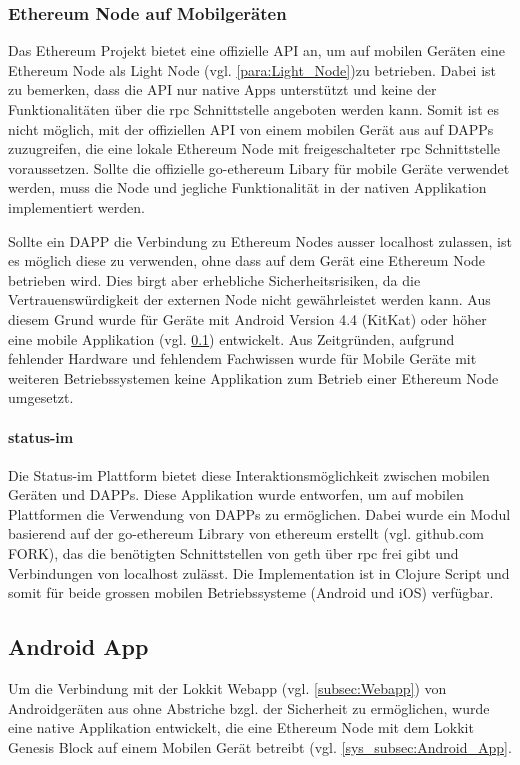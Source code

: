 \subsubsection{Ethereum Node auf Mobilgeräten}
Das Ethereum Projekt bietet eine offizielle API an, um auf mobilen Geräten eine Ethereum Node als Light Node (vgl. \ref{para:Light_Node})zu betrieben. Dabei ist zu bemerken, dass die API nur native Apps unterstützt und keine der Funktionalitäten über die rpc Schnittstelle angeboten werden kann. Somit ist es nicht möglich, mit der offiziellen API von einem mobilen Gerät aus auf \acrshort{DAPPs} zuzugreifen, die eine lokale Ethereum Node mit freigeschalteter rpc Schnittstelle voraussetzen. Sollte die offizielle go-ethereum Libary für mobile Geräte verwendet werden, muss die Node und jegliche Funktionalität in der nativen Applikation implementiert werden.\cite[wiki/Mobile: Introduction]{go-ethereum}

Sollte ein \acrshort{DAPP} die Verbindung zu Ethereum Nodes ausser localhost zulassen, ist es möglich diese zu verwenden, ohne dass auf dem Gerät eine Ethereum Node betrieben wird. Dies birgt aber erhebliche Sicherheitsrisiken, da die Vertrauenswürdigkeit der externen Node nicht gewährleistet werden kann. Aus diesem Grund wurde für Geräte mit Android Version 4.4 (KitKat) oder höher eine mobile Applikation (vgl. \ref{subsec:Android_App}) entwickelt. Aus Zeitgründen, aufgrund fehlender Hardware und fehlendem Fachwissen wurde für Mobile Geräte mit weiteren Betriebssystemen keine Applikation zum Betrieb einer Ethereum Node umgesetzt.
\paragraph{status-im}
Die Status-im Plattform bietet diese Interaktionsmöglichkeit zwischen mobilen Geräten und \acrshort{DAPPs}. Diese Applikation wurde entworfen, um auf mobilen Plattformen die Verwendung von \acrshort{DAPPs} zu ermöglichen. Dabei wurde ein Modul basierend auf der go-ethereum Library von ethereum erstellt (vgl. github.com FORK), das die benötigten Schnittstellen von geth über rpc frei gibt und Verbindungen von localhost zulässt. Die Implementation ist in Clojure Script und somit für beide grossen mobilen Betriebssysteme (Android und iOS) verfügbar.\cite{status-im_whitepaper, github.com/status-im/status-go}

\subsection{Android App}
\label{subsec:Android_App}
Um die Verbindung mit der Lokkit Webapp (vgl. \ref{subsec:Webapp}) von Androidgeräten aus ohne Abstriche bzgl. der Sicherheit zu ermöglichen, wurde eine native Applikation entwickelt, die eine Ethereum Node mit dem Lokkit Genesis Block auf einem Mobilen Gerät betreibt (vgl. \ref{sys_subsec:Android_App}.

